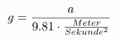 \documentclass[preview]{standalone}
\begin{document}
\begin{align*}
\special{dvisvgm:raw <g id='unique000'>}g = \frac{a}{9.81 \cdot \frac{Meter}{Sekunde^{2}}}\special{dvisvgm:raw </g>}
\end{align*}
\end{document}
